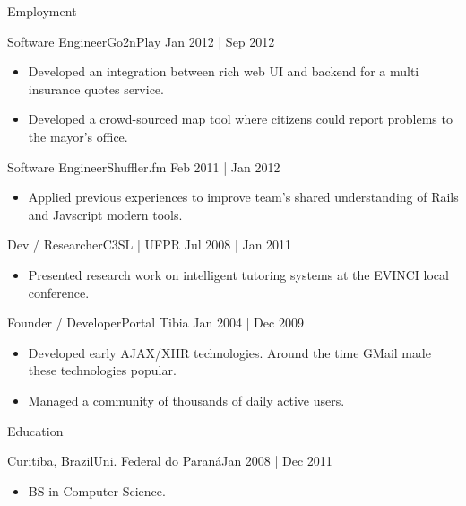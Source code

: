 \documentclass[]{mcdowellcv}
\begin{document}
\begin{cvsection}{Employment}
\begin{cvsubsection}{Software Engineer}{Go2nPlay }{Jan 2012 | Sep 2012}
	\begin{itemize}%
	    \item Developed an integration between rich web UI and backend for a multi insurance quotes service.
	    \item Developed a crowd-sourced map tool where citizens could report problems to the mayor's office.
	\end{itemize}
    \end{cvsubsection}
    \begin{cvsubsection}{Software Engineer}{Shuffler.fm }{Feb 2011 | Jan 2012}
	\begin{itemize}%
	    \item Applied previous experiences to improve team's shared understanding of Rails and Javscript modern tools.
	\end{itemize}
    \end{cvsubsection}
    \begin{cvsubsection}{Dev / Researcher}{C3SL | UFPR }{Jul 2008 | Jan 2011}
	\begin{itemize}%
	    \item Presented research work on intelligent tutoring systems at the EVINCI local conference.
	\end{itemize}
    \end{cvsubsection}
    \begin{cvsubsection}{Founder / Developer}{Portal Tibia }{Jan 2004 | Dec 2009}
	\begin{itemize}%
	    \item Developed early AJAX/XHR technologies. Around the time GMail made these technologies popular.
	    \item Managed a community of thousands of daily active users.
	\end{itemize}
    \end{cvsubsection}
\end{cvsection}

\begin{cvsection}{Education}
    \begin{cvsubsection}{Curitiba, Brazil}{Uni. Federal do Paraná}{Jan 2008 | Dec 2011}
	\begin{itemize}
	    \item BS in Computer Science.
	\end{itemize}
    \end{cvsubsection}
\end{cvsection}
\end{document}
